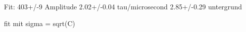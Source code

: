 Fit:
403+/-9 Amplitude
2.02+/-0.04 tau/microsecond
2.85+/-0.29 untergrund

fit mit sigma = sqrt(C)




